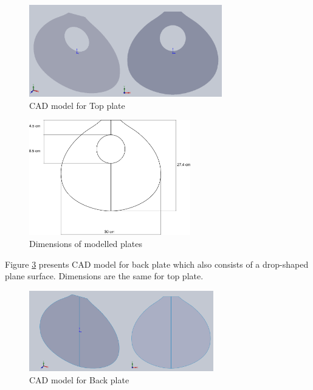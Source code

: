\begin{figure}[h]
\centering
\includegraphics[height=4cm]{img/CADTopPlate.png}
\caption{CAD model for Top plate}
\label{CADTopPlate}
\end{figure}

\begin{figure}[h]
\centering
\includegraphics[height=5cm]{img/bandolaFrontarea.pdf}
\caption{Dimensions of modelled plates}
\label{PlateDimensions}
\end{figure}

Figure \ref{CADBackPlate} presents CAD model for back plate which also consists of a drop-shaped plane surface. Dimensions are the same for top plate. \\

\begin{figure}[h]
\centering
\includegraphics[height=3.5cm]{img/CADBackPlate.png}
\caption{CAD model for Back plate}
\label{CADBackPlate}
\end{figure}


